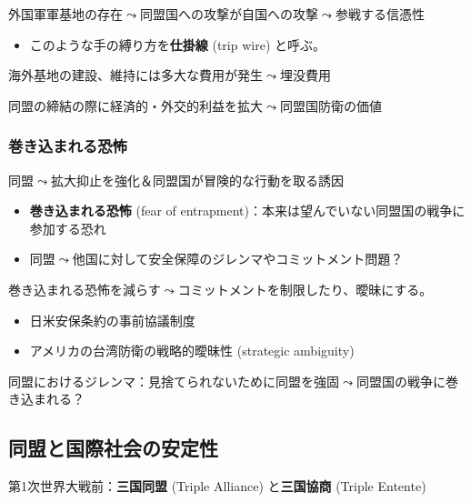 \documentclass[
  xelatex,
  ja=standard]{bxjsarticle}
\providecommand{\tightlist}{%
  \setlength{\itemsep}{0pt}\setlength{\parskip}{0pt}}\usepackage{longtable,booktabs,array}
\begin{document}
外国軍軍基地の存在\(\leadsto\)同盟国への攻撃が自国への攻撃\(\leadsto\)参戦する信憑性

\begin{itemize}
\tightlist
\item
  このような手の縛り方を\textbf{仕掛線} (trip wire)
  と呼ぶ\citep{schelling2018}。
\end{itemize}

海外基地の建設、維持には多大な費用が発生\(\leadsto\)埋没費用\citep{fearon1997}

同盟の締結の際に経済的・外交的利益を拡大\(\leadsto\)同盟国防衛の価値\citep{gowa1993, poast2012}

\hypertarget{ux5dfbux304dux8fbcux307eux308cux308bux6050ux6016}{%
\subsubsection{巻き込まれる恐怖}\label{ux5dfbux304dux8fbcux307eux308cux308bux6050ux6016}}

同盟\(\leadsto\)拡大抑止を強化＆同盟国が冒険的な行動を取る誘因

\begin{itemize}
\tightlist
\item
  \textbf{巻き込まれる恐怖} (fear of
  entrapment)：本来は望んでいない同盟国の戦争に参加する恐れ\citep{snyder1984}
\item
  同盟\(\leadsto\)他国に対して安全保障のジレンマやコミットメント問題？
\end{itemize}

巻き込まれる恐怖を減らす\(\leadsto\)コミットメントを制限したり、曖昧にする。

\begin{itemize}
\tightlist
\item
  日米安保条約の事前協議制度
\item
  アメリカの台湾防衛の戦略的曖昧性 (strategic ambiguity)
\end{itemize}

同盟におけるジレンマ：見捨てられないために同盟を強固\(\leadsto\)同盟国の戦争に巻き込まれる？

\hypertarget{ux540cux76dfux3068ux56fdux969bux793eux4f1aux306eux5b89ux5b9aux6027}{%
\subsection{同盟と国際社会の安定性}\label{ux540cux76dfux3068ux56fdux969bux793eux4f1aux306eux5b89ux5b9aux6027}}

第1次世界大戦前：\textbf{三国同盟} (Triple Alliance) と\textbf{三国協商}
(Triple Entente)
\end{document}
